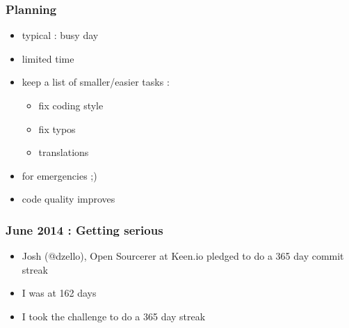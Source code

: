 \documentclass[14pt]{beamer}
\begin{document}
  \begin{frame}
    \frametitle{Planning}
    \begin{itemize}
      \item typical : busy day
      \item limited time
      \item keep a list of smaller/easier tasks :
      \begin{itemize}
        \item fix coding style
        \item fix typos
        \item translations
      \end{itemize}
      \item for emergencies ;)
      \item code quality improves
    \end{itemize}
  \end{frame}
  \begin{frame}
    \frametitle{June 2014 : Getting serious}
    \begin{itemize}
      \item Josh (@dzello), Open Sourcerer at Keen.io pledged to do a 365 day commit streak
      \item I was at 162 days
      \item I took the challenge to do a 365 day streak
    \end{itemize}
  \end{frame}
\end{document}
